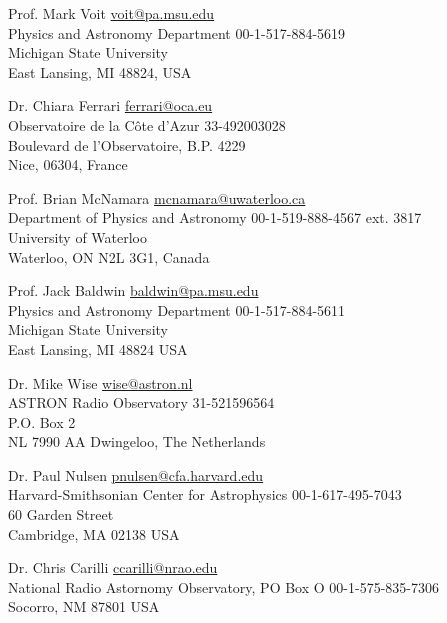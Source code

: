 \documentclass[12pt]{cv}
\begin{document}
Prof. Mark Voit \hfill \href{mailto:voit@pa.msu.edu}{voit@pa.msu.edu}\\
Physics and Astronomy Department \hfill 00-1-517-884-5619\\
Michigan State University\\
East Lansing, MI 48824, USA

Dr. Chiara Ferrari \hfill \href{mailto:ferrari@oca.eu}{ferrari@oca.eu}\\
Observatoire de la C\^ote d’Azur \hfill 33-492003028\\
Boulevard de l’Observatoire, B.P. 4229\\
Nice, 06304, France

Prof. Brian McNamara \hfill \href{mailto:mcnamara@uwaterloo.ca}{mcnamara@uwaterloo.ca}\\
Department of Physics and Astronomy \hfill 00-1-519-888-4567 ext. 3817\\
University of Waterloo\\
Waterloo, ON N2L 3G1, Canada

Prof. Jack Baldwin \hfill \href{mailto:baldwin@pa.msu.edu}{baldwin@pa.msu.edu}\\
Physics and Astronomy Department \hfill 00-1-517-884-5611\\
Michigan State University\\
East Lansing, MI 48824 USA

Dr. Mike Wise \hfill \href{mailto:wise@astron.nl}{wise@astron.nl}\\
ASTRON Radio Observatory \hfill 31-521596564\\
P.O. Box 2\\
NL 7990 AA Dwingeloo, The Netherlands

Dr. Paul Nulsen \hfill \href{mailto:pnulsen@cfa.harvard.edu}{pnulsen@cfa.harvard.edu}\\
Harvard-Smithsonian Center for Astrophysics \hfill 00-1-617-495-7043\\
60 Garden Street\\
Cambridge, MA 02138 USA

Dr. Chris Carilli \hfill \href{mailto:ccarilli@nrao.edu}{ccarilli@nrao.edu}\\
National Radio Astornomy Observatory, PO Box O \hfill 00-1-575-835-7306\\
Socorro, NM 87801 USA
\end{document}
